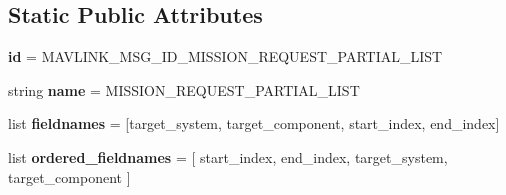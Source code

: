 \subsection*{Static Public Attributes}
\begin{DoxyCompactItemize}
\item 
\mbox{\label{classpymavlink_1_1dialects_1_1v10_1_1MAVLink__mission__request__partial__list__message_a922c7c4a38e314ef99a2693b5a337de7}} 
{\bfseries id} = M\+A\+V\+L\+I\+N\+K\+\_\+\+M\+S\+G\+\_\+\+I\+D\+\_\+\+M\+I\+S\+S\+I\+O\+N\+\_\+\+R\+E\+Q\+U\+E\+S\+T\+\_\+\+P\+A\+R\+T\+I\+A\+L\+\_\+\+L\+I\+ST
\item 
\mbox{\label{classpymavlink_1_1dialects_1_1v10_1_1MAVLink__mission__request__partial__list__message_ac7d3bb2ae8887d422cdfaed940eeb98c}} 
string {\bfseries name} = \textquotesingle{}M\+I\+S\+S\+I\+O\+N\+\_\+\+R\+E\+Q\+U\+E\+S\+T\+\_\+\+P\+A\+R\+T\+I\+A\+L\+\_\+\+L\+I\+ST\textquotesingle{}
\item 
\mbox{\label{classpymavlink_1_1dialects_1_1v10_1_1MAVLink__mission__request__partial__list__message_a8e992cc97742f4148186fa906a36a2f1}} 
list {\bfseries fieldnames} = \mbox{[}\textquotesingle{}target\+\_\+system\textquotesingle{}, \textquotesingle{}target\+\_\+component\textquotesingle{}, \textquotesingle{}start\+\_\+index\textquotesingle{}, \textquotesingle{}end\+\_\+index\textquotesingle{}\mbox{]}
\item 
\mbox{\label{classpymavlink_1_1dialects_1_1v10_1_1MAVLink__mission__request__partial__list__message_a7434cd28bc7df67599debb2348ff8211}} 
list {\bfseries ordered\+\_\+fieldnames} = \mbox{[} \textquotesingle{}start\+\_\+index\textquotesingle{}, \textquotesingle{}end\+\_\+index\textquotesingle{}, \textquotesingle{}target\+\_\+system\textquotesingle{}, \textquotesingle{}target\+\_\+component\textquotesingle{} \mbox{]}
\item 
\mbox{\label{classpymavlink_1_1dialects_1_1v10_1_1MAVLink__mission__request__partial__list__message_a5f5ca39405be95b74a2a0d437434dadd}} 

\end{DoxyCompactItemize}

